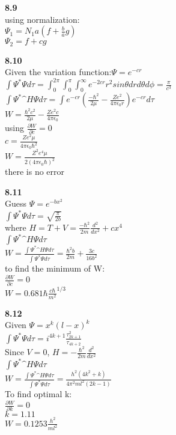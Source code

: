 \documentclass{article}
\begin{document}
\textbf{8.9}\\
using normalization:\\
$\Psi_1 = N_1a(f+\frac{b}{a}g)$\\
$\Psi_2 = f+cg$\\
\newline

\textbf{8.10}\\
Given the variation function:$\Psi = e^{-cr}$\\
$\int \Psi^*\Psi d\tau = \int_0^{2\pi}\int_0^{\pi}\int_0^{\infty}e^{-2cr}r^2sin\theta drd\theta d\phi = \frac{\pi}{c^3}$\\
$\int \Psi^* \^{H}\Psi d\tau = \int e^{-cr}(\frac{-\hbar^2}{2\mu}-\frac{Ze^2}{4\pi \epsilon_0 r})e^{-cr}d\tau$\\
$W = \frac{\hbar^2c^2}{2\mu} - \frac{Ze^2c}{4\pi \epsilon_0}$\\
using $\frac{\partial W}{\partial c} = 0$\\
$c = \frac{Ze^2\mu}{4\pi \epsilon_0 \hbar^2}$\\
$W = \frac{Z^2e^4\mu}{2(4\pi \epsilon_0 \hbar)^2}$\\
there is no error\\
\newline

\textbf{8.11}\\
Guess $\Psi = e^{-bx^2}$\\
$\int \Psi^*\Psi d\tau = \sqrt{\frac{\pi}{2b}}$\\
where $H = T + V = \frac{-\hbar^2}{2m}\frac{d^2}{dx^2}+cx^4$\\
$\int \Psi^* \^{H}\Psi d\tau$\\
$W = \frac{\int \Psi^* \^{H}\Psi d\tau}{\int \Psi^*\Psi d\tau} = \frac{\hbar^2b}{2m}+\frac{3c}{16b^2}$\\
to find the minimum of W:\\
$\frac{\partial W}{\partial c} = 0$\\
$W = 0.681\hbar\frac{c\hbar}{m^2}^{1/3}$\\
\newline

\textbf{8.12}\\
Given $\Psi = x^k(l - x)^k$\\
$\int \Psi^*\Psi d\tau = i^{4k+1}\frac{\tau_{2k+1}^2}{\tau_{4k+2}}$\\
Since $V = 0$, $H = -\frac{\hbar^2}{2m}\frac{d^2}{dx^2}$\\
$\int \Psi^*\^{H}\Psi d\tau$\\
$W = \frac{\int \Psi^*\^{H}\Psi d\tau}{\int \Psi^*\Psi d\tau} = \frac{h^2(4k^2+k)}{4\pi^2 ml^2(2k-1)}$\\
To find optimal k:\\
$\frac{\partial W}{\partial k} = 0$\\
$k = 1.11$\\
$W = 0.1253\frac{h^2}{ml^2}$\\
\newline
\end{document}
